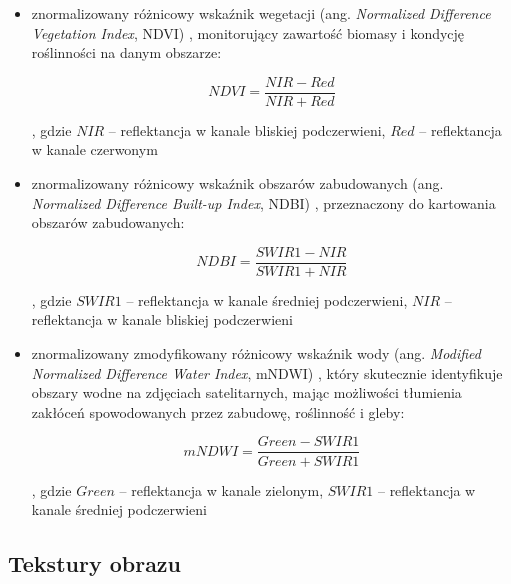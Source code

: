 \documentclass{amuthesis}
\begin{document}
\begin{itemize}
\item
  znormalizowany różnicowy wskaźnik wegetacji (ang. \emph{Normalized
  Difference Vegetation Index}, NDVI) \autocite{ndvi}, monitorujący
  zawartość biomasy i kondycję roślinności na danym obszarze:

  \[
  NDVI = \frac{NIR - Red}{NIR + Red}
  \]

  , gdzie \(NIR\) -- reflektancja w kanale bliskiej podczerwieni,
  \(Red\) -- reflektancja w kanale czerwonym
\item
  znormalizowany różnicowy wskaźnik obszarów zabudowanych (ang.
  \emph{Normalized Difference Built-up Index}, NDBI) \autocite{ndbi},
  przeznaczony do kartowania obszarów zabudowanych:

  \[
  NDBI = \frac{SWIR1 - NIR}{SWIR1 + NIR}
  \]

  , gdzie \(SWIR1\) -- reflektancja w kanale średniej podczerwieni,
  \(NIR\) -- reflektancja w kanale bliskiej podczerwieni
\item
  znormalizowany zmodyfikowany różnicowy wskaźnik wody (ang.
  \emph{Modified Normalized Difference Water Index}, mNDWI)
  \autocite{mndwi}, który skutecznie identyfikuje obszary wodne na
  zdjęciach satelitarnych, mając możliwości tłumienia zakłóceń
  spowodowanych przez zabudowę, roślinność i gleby:

  \[
  mNDWI = \frac{Green - SWIR1}{Green + SWIR1}
  \]

  , gdzie \(Green\) -- reflektancja w kanale zielonym, \(SWIR1\) --
  reflektancja w kanale średniej podczerwieni
\end{itemize}

\hypertarget{sec-textures}{%
\subsection{Tekstury obrazu}\label{sec-textures}}
\end{document}
